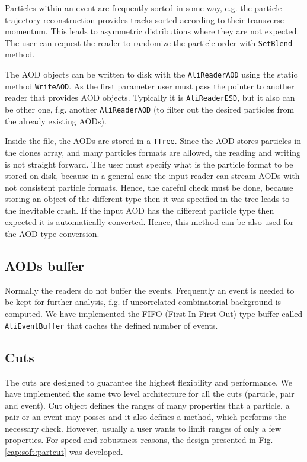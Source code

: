 \documentclass[12pt,a4paper,twoside]{article}
\begin{document}
{%
Particles within an event are frequently sorted in some way, e.g.
the particle trajectory reconstruction provides tracks sorted according
to their transverse momentum. This leads to asymmetric 
distributions where they are not expected. The user can request the
reader to randomize the particle order with \texttt{SetBlend} method.

The AOD objects can be written to disk with the \texttt{AliReaderAOD}
using the static method \texttt{WriteAOD}. As the first
parameter user must pass the pointer to another reader that 
provides AOD objects. Typically it is \texttt{AliReaderESD},
but it also can be other one, f.g. another \texttt{AliReaderAOD} 
(to filter out the desired particles from the already existing AODs).

Inside the file, the AODs are stored in a \texttt{TTree}.
Since the AOD stores particles in the clones array, and many particles
formats are allowed, the reading and writing is not straight forward.
The user must specify what is the particle format to be stored on disk,
because in a general case the input reader can stream AODs with not consistent
particle formats. Hence, the careful check must be done, because storing 
an object of the different type then it was specified in the tree leads
to the inevitable crash. If the input AOD has the different particle type then
expected it is automatically converted. Hence, this method can be also used
for the AOD type conversion.


\subsection{AODs buffer}

Normally the readers do not buffer the events. 
Frequently an event is needed to be kept for further analysis, 
f.g. if uncorrelated combinatorial background is computed. 
We have implemented the FIFO (First In First Out) type buffer called
\texttt{AliEventBuffer} that caches the defined number of events.


\subsection{Cuts}

The cuts are designed to guarantee the highest flexibility 
and performance. We have implemented the same two level architecture 
for all the cuts (particle, pair and event). 
Cut object defines the ranges of many properties that a particle, a pair or 
an event may posses and it also defines a method, which performs the
necessary check. However, usually a user wants to limit
ranges of only a few properties. For speed and robustness reasons, 
the design presented in Fig.\ref{cap:soft:partcut} was developed.

}
\end{document}
